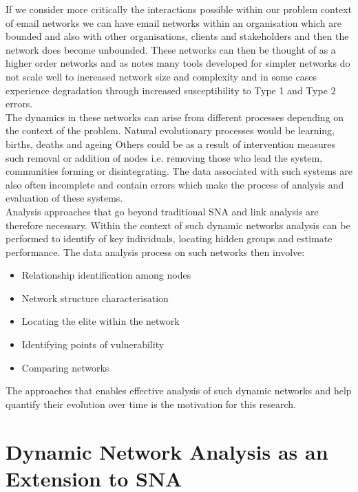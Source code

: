 If we consider more critically the interactions possible within our problem context of email networks we can have email networks within an organisation which are bounded and also with other organisations, clients and stakeholders and then the network does become unbounded. These networks can then be thought of as a higher order networks and as  \citeauthor{Carley2001}\cite{Carley2001} notes many tools developed for simpler networks do not scale well to increased network size and complexity and in some cases experience degradation through increased susceptibility to Type 1 and Type 2 errors. \\

The dynamics in these networks can arise from different processes depending on the context of the problem. Natural evolutionary processes would be learning, births, deaths and ageing Others could be as a result of intervention measures such removal or addition of nodes i.e. removing those who lead the system, communities forming or disintegrating. The data associated with such systems are also often incomplete and contain errors which make the process of analysis and evaluation of these systems.\cite{Carley2007}\\

Analysis approaches that go beyond traditional SNA and link analysis are therefore necessary. Within the context of such dynamic networks analysis can be performed to identify of key individuals, locating hidden groups and estimate performance.  The data analysis process on such networks then involve: \cite{Carley2001,Carley2007}

\begin{itemize}
    \item Relationship identification among nodes
    \item Network structure characterisation
    \item Locating the elite within the network
    \item Identifying points of vulnerability 
    \item Comparing networks
\end{itemize}


The approaches that enables effective analysis of such dynamic networks and help quantify their evolution over time is the motivation for this research. 

\section{Dynamic Network Analysis as an Extension to SNA}


